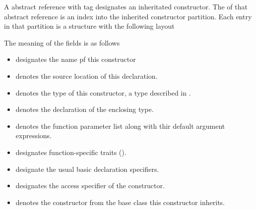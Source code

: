 A  abstract reference with tag 
designates an inheritated constructor.  The  of that abstract reference
is an index into the inherited constructor partition.  Each entry in that partition
is a structure with the following layout
%
\begin{figure}[H]
	\centering
\end{figure}
%
The meaning of the fields is as follows
\begin{itemize}
	\item {} designates the name pf this constructor
	\item {} denotes the source location of this declaration.
	\item {} denotes the type of this constructor, a type described in .
	\item {} denotes the declaration of the enclosing type.
	\item {} denotes the function parameter list along with thir default argument expressions.
	\item {} designates function-specific traits ().
	\item {} designate the usual basic declaration specifiers.
	\item {} designates the access specifier of the constructor.
	\item {} denotes the constructor from the base class this constructor inherits.
\end{itemize}


\subsection{} 
\label{sec:ifc:DeclSort:Destructor}

